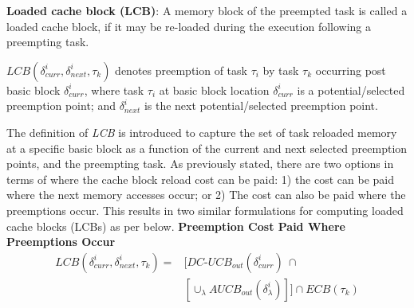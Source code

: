 \begin{definition}
\textbf{Loaded cache block (LCB)}: A memory block of the preempted task is called a loaded cache block, if it may be re-loaded during the execution following a preempting task.
\end{definition}
\noindent
\begin{math}\textit{LCB}(\delta_{curr}^{i},\delta_{next}^{i},\tau_{k})\end{math} denotes preemption of task \begin{math}\tau_{i}\end{math} by task \begin{math}\tau_{k}\end{math} occurring post basic block \begin{math}\delta_{curr}^{i}\end{math}, where task \begin{math}\tau_{i}\end{math} at basic block location \begin{math}\delta_{curr}^{i}\end{math} is a potential/selected preemption point; and \begin{math}\delta_{next}^{i}\end{math} is the next potential/selected preemption point.

The definition of \textit{LCB} is introduced to capture the set of task reloaded memory at a specific basic block as a function of the current and next selected preemption points, and the preempting task.  As previously stated, there are two options in terms of where the cache block reload cost can be paid: 1) the cost can be paid where the next memory accesses occur; or 2) The cost can also be paid where the preemptions occur.  This results in two similar formulations for computing loaded cache blocks (LCBs) as per below.
\newline
\newline
\noindent\textbf{Preemption Cost Paid Where Preemptions Occur}
\begin{equation}\label{eqn:lcb-formula-1}
\begin{split}
    \textit{LCB}(\delta_{curr}^{i},\delta_{next}^{i},\tau_{k}) = &[\textit{DC-UCB}_{out}(\delta_{curr}^{i})\ \cap \\
    &[\cup_\lambda \textit{AUCB}_{out}(\delta_{\lambda}^{i})]] \cap \textit{ECB}(\tau_{k})\\
\end{split}
\end{equation}

